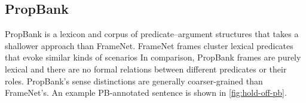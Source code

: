 \documentclass[11pt,a4paper]{article}
\newcommand{\ensuretext}[1]{#1}
\newcommand{\mkmarker}{\ensuretext{\textcolor{red}{\ensuremath{^{\textsc{M}}_{\textsc{K}}}}}}
\newcommand{\stmarker}{\ensuretext{\textcolor{orange}{\ensuremath{^{\textsc{S}}_{\textsc{T}}}}}}
\newcommand{\arkcomment}[3]{\ensuretext{\textcolor{#3}{[#1 #2]}}}
\newcommand{\mk}[1]{\arkcomment{\mkmarker}{#1}{red}}
\newcommand{\st}[1]{\arkcomment{\stmarker}{#1}{orange}}
\newcommand{\citeposs}[2][]{\citeauthor{#2}'s (\citeyear[#1]{#2})}
\newcommand{\pbf}[1]{\mbox{\textsf{#1}}} %
\newcommand{\pbr}[1]{\textbf{\textsf{#1}}} %
\newcommand{\finalversion}[1]{#1}
\begin{document}


\subsection{PropBank}\label{sec:pb}
PropBank \citep[PB;][]{palmer-05} is a lexicon and corpus of predicate--argument
structures that takes a shallower approach than FrameNet. 
FrameNet frames cluster lexical predicates that evoke similar kinds of scenarios %
In comparison, 
PropBank frames are purely lexical and there are no formal relations between different predicates 
or their roles. PropBank's sense distinctions are generally coarser-grained than FrameNet's.
An example PB-annotated sentence is shown in \cref{fig:hold-off-pb}.

\end{document}
